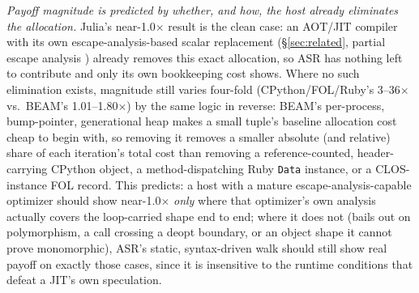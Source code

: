 \documentclass[sigplan,screen,review,anonymous]{acmart}
\begin{document}
\emph{Payoff magnitude is predicted by whether, and how, the host already
eliminates the allocation.} Julia's near-1.0$\times$ result is the clean
case: an AOT/JIT compiler with its own escape-analysis-based scalar
replacement (\S\ref{sec:related}, partial escape analysis
\cite{stadler2014partial}) already removes this exact allocation, so ASR
has nothing left to contribute and only its own bookkeeping cost shows.
Where no such elimination exists, magnitude still varies four-fold
(CPython/FOL/Ruby's 3--36$\times$ vs.\ BEAM's 1.01--1.80$\times$) by the
same logic in reverse: BEAM's per-process, bump-pointer, generational heap
makes a small tuple's baseline allocation cost cheap to begin with, so
removing it removes a smaller absolute (and relative) share of each
iteration's total cost than removing a reference-counted, header-carrying
CPython object, a method-dispatching Ruby \texttt{Data} instance, or a
CLOS-instance FOL record. This predicts: a host with a mature
escape-analysis-capable optimizer should show near-1.0$\times$
\emph{only} where that optimizer's own analysis actually covers the
loop-carried shape end to end; where it does not (bails out on
polymorphism, a call crossing a deopt boundary, or an object shape it
cannot prove monomorphic), ASR's static, syntax-driven walk should still
show real payoff on exactly those cases, since it is insensitive to the
runtime conditions that defeat a JIT's own speculation.
\end{document}
